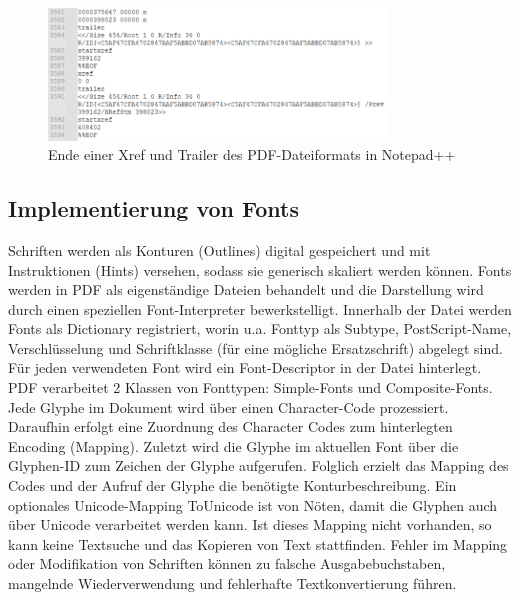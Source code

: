 \begin{figure}[!htb]
	\centering
	\includegraphics[width=0.8\textwidth]{"images/pdf_trailer2-notepad.png"}
	\caption{Ende einer Xref und Trailer des PDF-Dateiformats in Notepad++}
	\label{fig:trailer2}
\end{figure}

\subsection{Implementierung von Fonts}
Schriften werden als Konturen (Outlines) digital gespeichert und mit Instruktionen (Hints) versehen, sodass sie generisch skaliert werden können. Fonts werden in PDF als eigenständige Dateien behandelt und die Darstellung wird durch einen speziellen Font-Interpreter bewerkstelligt. Innerhalb der Datei werden Fonts als Dictionary registriert, worin u.a. Fonttyp als Subtype, PostScript-Name, Verschlüsselung und Schriftklasse (für eine mögliche Ersatzschrift) abgelegt sind. Für jeden verwendeten Font wird ein Font-Descriptor in der Datei hinterlegt. PDF verarbeitet 2 Klassen von Fonttypen: Simple-Fonts und Composite-Fonts. \\
Jede Glyphe im Dokument wird über einen Character-Code prozessiert. Daraufhin erfolgt eine Zuordnung des Character Codes zum hinterlegten Encoding (Mapping). Zuletzt wird die Glyphe im aktuellen Font über die Glyphen-ID zum Zeichen der Glyphe aufgerufen. Folglich erzielt das Mapping des Codes und der Aufruf der Glyphe die benötigte Konturbeschreibung. Ein optionales Unicode-Mapping ToUnicode ist von Nöten, damit die Glyphen auch über Unicode verarbeitet werden kann. Ist dieses Mapping nicht vorhanden, so kann keine Textsuche und das Kopieren von Text stattfinden. Fehler im Mapping oder Modifikation von Schriften können zu falsche Ausgabebuchstaben, mangelnde Wiederverwendung und fehlerhafte Textkonvertierung führen. \\
